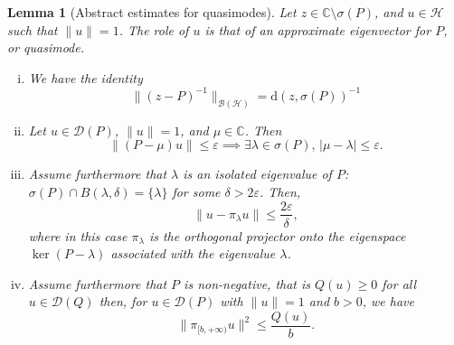 \documentclass[10pt]{article}
\newcommand{\1}{\mathbbm 1}
\newtheorem{lemma}{Lemma}
\begin{document}
    \begin{lemma}[Abstract estimates for quasimodes]
        Let $z \in \mathbb C \setminus \sigma(P)$, and $u \in \mathcal H$ such that $\|u\|=1$. The role of $u$ is that of an approximate eigenvector for $P$, or quasimode.
        \begin{enumerate}[i)]
            \item {We have the identity \begin{equation}
                \label{eq:distance_to_spectrum}
                \|(z-P)^{-1}\|_{\mathcal B(\mathcal H)} =  \mathrm{d}(z,\sigma(P))^{-1}
            \end{equation}}
            \item {Let $u\in\mathcal D(P)$, $\|u\|=1$, and $\mu\in \mathbb C$. Then \begin{equation}
                \label{eq:resolvent_estimate_lambda}
                \|(P-\mu)u\| \leq \varepsilon \implies \exists \lambda\in\sigma(P),\,|\mu-\lambda|\leq \varepsilon.
            \end{equation}}
            \item {Assume furthermore that $\lambda$ is an isolated eigenvalue of $P$: $\sigma(P) \cap B(\lambda,\delta) = \{\lambda\}$ for some $\delta >2\varepsilon$. Then,
            \begin{equation}
                \label{eq:resolvent_estimate_u}
                \|u-\pi_\lambda u\| \leq \frac{2\varepsilon}{\delta},
            \end{equation}
            where in this case $\pi_\lambda$ is the orthogonal projector onto the eigenspace $\ker(P-\lambda)$ associated with the eigenvalue $\lambda$.
            }
            \item{
                Assume furthermore that $P$ is non-negative, that is $Q(u)\geq 0$ for all $u\in\mathcal D(Q)$  then, for $u\in\mathcal D(P)$ with $\|u\|=1$ and $b>0$, we have
                \begin{equation}
                    \label{eq:spectral_markov_inequality}
                    \|\pi_{[b,+\infty)}u\|^2 \leq \frac{Q(u)}{b}.
                \end{equation}
            }
        \end{enumerate}
    \end{lemma}
\end{document}

